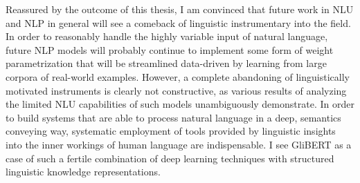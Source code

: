 Reassured by the outcome of this thesis, I am convinced that future work in NLU and
NLP in general will see a comeback of linguistic instrumentary into the field. In
order to reasonably handle the highly variable input of natural language, future NLP
models will probably continue to implement some form of weight parametrization that
will be streamlined data-driven by learning from large corpora of real-world examples.
However, a complete abandoning of linguistically motivated instruments is clearly not
constructive, as various results of analyzing the limited NLU capabilities of
such models unambiguously demonstrate. In order to build systems that are able
to process natural language in a deep, semantics conveying way, systematic employment
of tools provided by linguistic insights into the inner workings of human language
are indispensable. I see GliBERT as a case of such a fertile combination of deep
learning techniques with structured linguistic knowledge representations.

